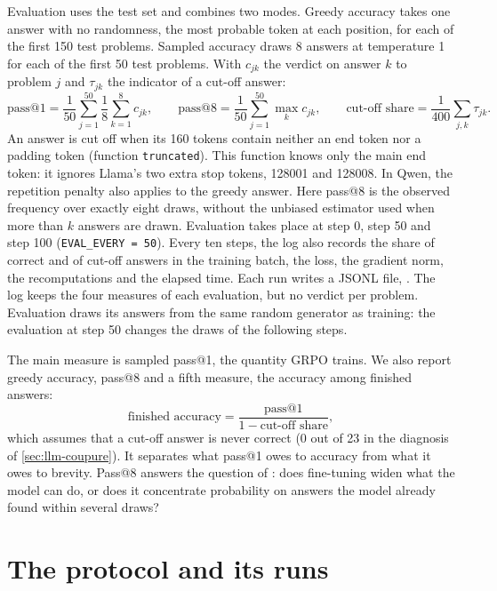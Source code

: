 Evaluation uses the test set and combines two modes. Greedy accuracy takes one answer with no
randomness, the most probable token at each position, for each of the first 150 test problems. Sampled
accuracy draws 8 answers at temperature 1 for each of the first 50 test problems. With $c_{jk}$ the
verdict on answer $k$ to problem $j$ and $\tau_{jk}$ the indicator of a cut-off answer:
\begin{equation}
  \text{pass@1} = \frac{1}{50}\sum_{j=1}^{50} \frac18 \sum_{k=1}^{8} c_{jk}, \qquad
  \text{pass@8} = \frac{1}{50}\sum_{j=1}^{50} \max_{k} c_{jk}, \qquad
  \text{cut-off share} = \frac{1}{400}\sum_{j,k} \tau_{jk}.
\end{equation}
An answer is cut off when its 160 tokens contain neither an end token nor a padding token (function
\texttt{truncated}). This function knows only the main end token: it ignores Llama's two extra stop
tokens, 128001 and 128008. In Qwen, the repetition penalty also applies to the
greedy answer. Here pass@8 is the observed frequency over exactly eight draws, without the unbiased
estimator used when more than $k$ answers are drawn. Evaluation takes place at step 0, step 50 and
step 100 (\texttt{EVAL\_EVERY = 50}). Every ten steps, the log also records the share of correct and of
cut-off answers in the training batch, the loss, the gradient norm, the recomputations and the elapsed
time. Each run writes a JSONL file, . The log
keeps the four measures of each evaluation, but no verdict per problem. Evaluation draws its answers from
the same random generator as training: the evaluation at step 50 changes the draws of the following steps.

The main measure is sampled pass@1, the quantity GRPO trains. We also report greedy accuracy, pass@8 and
a fifth measure, the accuracy among finished answers:
\begin{equation}
  \text{finished accuracy} = \frac{\text{pass@1}}{1 - \text{cut-off share}},
\end{equation}
which assumes that a cut-off answer is never correct (0 out of 23 in the diagnosis of
\cref{sec:llm-coupure}). It separates what pass@1 owes to accuracy from what it owes to brevity.
Pass@8 answers the question of \textcite{yue2025rlvr}: does fine-tuning widen what the model can do, or
does it concentrate probability on answers the model already found within several draws?

\section{The protocol and its runs}
\label{sec:llm-protocole}

